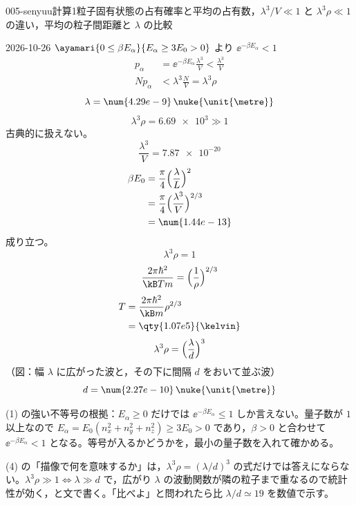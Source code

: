 \documentclass[uplatex,dvipdfmx,a4paper,11pt]{jsarticle}
\begin{document}
\begin{mondai}{005-senyuu}{計算}{1粒子固有状態の占有確率と平均の占有数，$\lambda^{3}/V\ll1$ と $\lambda^{3}\rho\ll1$ の違い，平均の粒子間距離と $\lambda$ の比較}
\begin{kotaeutsushi}{2026-10-26}
$\ayamari{0\le\beta E_\alpha}{E_\alpha\ge3E_0>0}$ より $\ee^{-\beta E_\alpha}<1$
\begin{align*}
p_\alpha&=\ee^{-\beta E_\alpha}\frac{\lambda^{3}}{V}<\frac{\lambda^{3}}{V}\\
Np_\alpha&<\lambda^{3}\frac{N}{V}=\lambda^{3}\rho
\end{align*}
\[ \lambda=\num{4.29e-9}\,\nuke{\unit{\metre}} \]
\[ \lambda^{3}\rho=\num{6.69e3}\gg1 \]
古典的に扱えない。
\[ \frac{\lambda^{3}}{V}=\num{7.87e-20} \]
\begin{align*}
\beta E_0&=\frac{\pi}{4}\Bigl(\frac{\lambda}{L}\Bigr)^{2}\\
&=\frac{\pi}{4}\Bigl(\frac{\lambda^{3}}{V}\Bigr)^{2/3}\\
&=\num{1.44e-13}
\end{align*}
成り立つ。
\[ \lambda^{3}\rho=1 \]
\[ \frac{2\pi\hbar^{2}}{\kB Tm}=\Bigl(\frac{1}{\rho}\Bigr)^{2/3} \]
\begin{align*}
T&=\frac{2\pi\hbar^{2}}{\kB m}\rho^{2/3}\\
&=\qty{1.07e5}{\kelvin}
\end{align*}
\[ \lambda^{3}\rho=\Bigl(\frac{\lambda}{d}\Bigr)^{3} \]
（図：幅 $\lambda$ に広がった波と，その下に間隔 $d$ をおいて並ぶ波）
\[ d=\num{2.27e-10}\,\nuke{\unit{\metre}} \]
\end{kotaeutsushi}
\begin{kizuki}
\item (1) の強い不等号の根拠：$E_\alpha\ge0$ だけでは $\ee^{-\beta E_\alpha}\le1$ しか言えない。量子数が $1$ 以上なので $E_\alpha=E_0(n_x^{2}+n_y^{2}+n_z^{2})\ge3E_0>0$ であり，$\beta>0$ と合わせて $\ee^{-\beta E_\alpha}<1$ となる。等号が入るかどうかを，最小の量子数を入れて確かめる。
\item (4) の「描像で何を意味するか」は，$\lambda^{3}\rho=(\lambda/d)^{3}$ の式だけでは答えにならない。$\lambda^{3}\rho\gg1\iff\lambda\gg d$ で，広がり $\lambda$ の波動関数が隣の粒子まで重なるので統計性が効く，と文で書く。「比べよ」と問われたら比 $\lambda/d\simeq19$ を数値で示す。

\end{kizuki}
\end{mondai}
\end{document}
